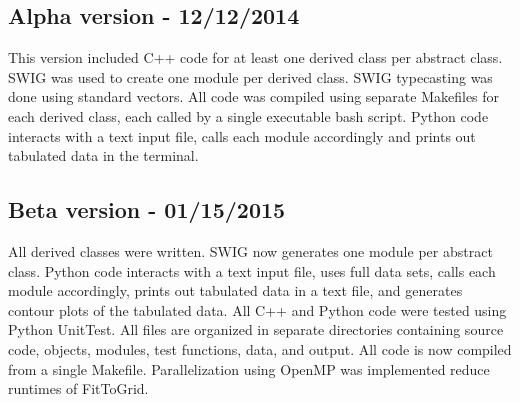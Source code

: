 \documentclass[11pt]{article}
\begin{document}
\subsection{Alpha version - 12/12/2014}
This version included C++ code for at least one derived class per
abstract class. SWIG was used to create one module per derived
class. SWIG typecasting was done using standard vectors. All code was
compiled using separate Makefiles for each derived class, each called
by a single executable bash script. Python code interacts with a text
input file, calls each module accordingly and prints out tabulated
data in the terminal.

\subsection{Beta version - 01/15/2015}
All derived classes were written. SWIG now generates one module per
abstract class. Python code interacts with a text input file, uses
full data sets, calls each module accordingly, prints out tabulated
data in a text file, and generates contour plots of the tabulated
data. All C++ and Python code were tested using Python UnitTest. All
files are organized in separate directories containing source code,
objects, modules, test functions, data, and output. All code is now
compiled from a single Makefile. Parallelization using OpenMP was
implemented reduce runtimes of FitToGrid.
\end{document}

